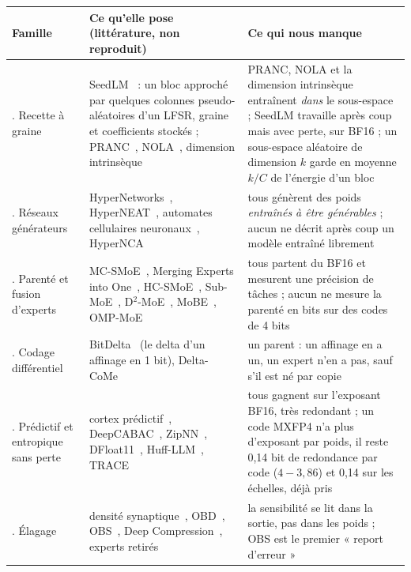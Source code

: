 \begin{table}[p]
\centering\scriptsize
\renewcommand{\arraystretch}{1.15}
\begin{tabularx}{\linewidth}{>{\raggedright\arraybackslash}p{2.3cm} >{\raggedright\arraybackslash}X >{\raggedright\arraybackslash}X}
\toprule
Famille & Ce qu'elle pose (littérature, non reproduit) & Ce qui nous manque \\
\midrule
1. Recette à graine & SeedLM~\cite{shafipour2024seedlm} : un bloc approché par quelques colonnes pseudo-aléatoires d'un LFSR, graine et coefficients stockés ; PRANC~\cite{nooralinejad2022pranc}, NOLA~\cite{koohpayegani2023nola}, dimension intrinsèque~\cite{li2018intrinsic} & PRANC, NOLA et la dimension intrinsèque entraînent \emph{dans} le sous-espace ; SeedLM travaille après coup mais avec perte, sur BF16 ; un sous-espace aléatoire de dimension $k$ garde en moyenne $k/C$ de l'énergie d'un bloc \\
2. Réseaux générateurs & HyperNetworks~\cite{ha2016hypernetworks}, HyperNEAT~\cite{stanley2009hyperneat}, automates cellulaires neuronaux~\cite{mordvintsev2020nca}, HyperNCA~\cite{najarro2022hypernca} & tous génèrent des poids \emph{entraînés à être générables} ; aucun ne décrit après coup un modèle entraîné librement \\
3. Parenté et fusion d'experts & MC-SMoE~\cite{li2023mcsmoe}, Merging Experts into One~\cite{he2023meo}, HC-SMoE~\cite{chen2024hcsmoe}, Sub-MoE~\cite{li2025submoe}, D$^2$-MoE~\cite{gu2025d2moe}, MoBE~\cite{chen2025mobe}, OMP-MoE~\cite{li2026ompmoe} & tous partent du BF16 et mesurent une précision de tâches ; aucun ne mesure la parenté en bits sur des codes de 4 bits \\
4. Codage différentiel & BitDelta~\cite{liu2024bitdelta} (le delta d'un affinage en 1 bit), Delta-CoMe~\cite{ping2024deltacome} & un parent : un affinage en a un, un expert n'en a pas, sauf s'il est né par copie \\
5. Prédictif et entropique sans perte & cortex prédictif~\cite{rao1999}, DeepCABAC~\cite{wiedemann2019deepcabac}, ZipNN~\cite{hershcovitch2024zipnn}, DFloat11~\cite{zhang2025dfloat11}, Huff-LLM~\cite{yubeaton2025huffllm}, TRACE~\cite{xie2025trace} & tous gagnent sur l'exposant BF16, très redondant ; un code MXFP4 n'a plus d'exposant par poids, il reste 0,14 bit de redondance par code ($4 - 3{,}86$) et 0,14 sur les échelles, déjà pris \\
6. Élagage & densité synaptique~\cite{huttenlocher1979}, OBD~\cite{lecun1989obd}, OBS~\cite{hassibi1992obs}, Deep Compression~\cite{han2015deepcompression}, experts retirés~\cite{lu2024notallexperts,martin2026ests} & la sensibilité se lit dans la sortie, pas dans les poids ; OBS est le premier « report d'erreur » \\

\end{tabularx}
\end{table}
